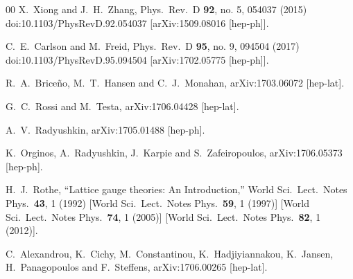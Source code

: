 \begin{thebibliography}{00}
	X.~Xiong and J.~H.~Zhang,
	Phys.\ Rev.\ D {\bf 92}, no. 5, 054037 (2015)
	doi:10.1103/PhysRevD.92.054037
	[arXiv:1509.08016 [hep-ph]].


	C.~E.~Carlson and M.~Freid,
	Phys.\ Rev.\ D {\bf 95}, no. 9, 094504 (2017)
	doi:10.1103/PhysRevD.95.094504
	[arXiv:1702.05775 [hep-ph]].


	R.~A.~Brice\~no, M.~T.~Hansen and C.~J.~Monahan,
	arXiv:1703.06072 [hep-lat].


	G.~C.~Rossi and M.~Testa,
	arXiv:1706.04428 [hep-lat].


	A.~V.~Radyushkin,
	arXiv:1705.01488 [hep-ph].


	K.~Orginos, A.~Radyushkin, J.~Karpie and S.~Zafeiropoulos,
	arXiv:1706.05373 [hep-ph].


	H.~J.~Rothe,
	``Lattice gauge theories: An Introduction,''
	World Sci.\ Lect.\ Notes Phys.\  {\bf 43}, 1 (1992)
	[World Sci.\ Lect.\ Notes Phys.\  {\bf 59}, 1 (1997)]
	[World Sci.\ Lect.\ Notes Phys.\  {\bf 74}, 1 (2005)]
	[World Sci.\ Lect.\ Notes Phys.\  {\bf 82}, 1 (2012)].






	C.~Alexandrou, K.~Cichy, M.~Constantinou, K.~Hadjiyiannakou, K.~Jansen, H.~Panagopoulos and F.~Steffens,
	arXiv:1706.00265 [hep-lat].



\end{thebibliography}
